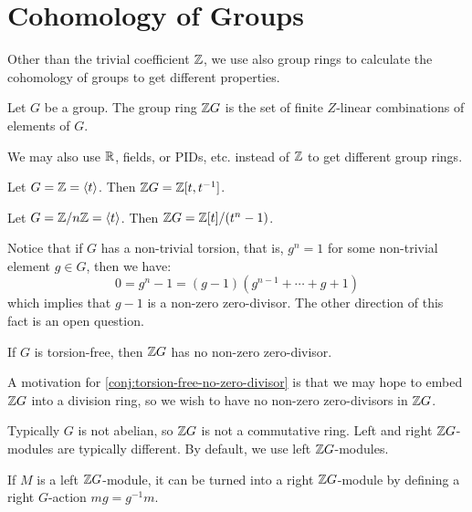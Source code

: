 \section{Cohomology of Groups}
\label{sec:L02-W01D2}


Other than the trivial coefficient \(\mathbb{Z}\), we use also group rings to calculate the cohomology of groups to get different properties. 

\begin{definition}
    \label{def:group-ring}
    Let \(G\) be a group. The group ring \(\mathbb{Z} G\) is the set of finite \(Z\)-linear combinations of elements of \(G\).
\end{definition}

\begin{remark}
    We may also use \(\mathbb{R}\),  fields, or PIDs, etc. instead of \(\mathbb{Z}\) to get different group rings.
\end{remark}

\begin{example}
    Let \(G=\mathbb{Z} =\langle t \rangle \). Then \(\mathbb{Z} G =  \mathbb{Z} [t,t^{-1}]\).
\end{example}

\begin{example}
    Let \(G=\mathbb{Z}/n\mathbb{Z} = \langle t \rangle \). Then \(\mathbb{Z} G= \mathbb{Z}[t]/(t^n-1)\).
\end{example}


Notice that if  \(G\) has a non-trivial torsion, that is, \(g^n  =1\) for some non-trivial element \(g\in G\),  then we have: 
\[ 0 = g^n -1 = (g-1)(g^{n-1}+\cdots + g+1) \]
which implies that \(g-1\) is a non-zero zero-divisor. The other direction of this fact is an open question.

\begin{question}
    \label{conj:torsion-free-no-zero-divisor}
    If \(G\) is torsion-free, then \(\mathbb{Z} G\) has no non-zero zero-divisor.
\end{question}

A motivation for \cref{conj:torsion-free-no-zero-divisor} is that we may hope to embed \(\mathbb{Z} G\) into a division ring, so we wish to have no non-zero zero-divisors in \(\mathbb{Z} G\).


Typically \(G\) is not abelian, so \(\mathbb{Z} G\) is not a commutative ring. Left and right \(\mathbb{Z} G\)-modules are typically different. By default, we use left \(\mathbb{Z} G\)-modules.

\begin{remark}
    \label{rmk:left-right-module-transfer}
    If \(M\) is a left \(\mathbb{Z} G\)-module, it can be turned into a right \(\mathbb{Z} G\)-module by defining a right \(G\)-action \(mg = g^{-1}m\).
\end{remark}

